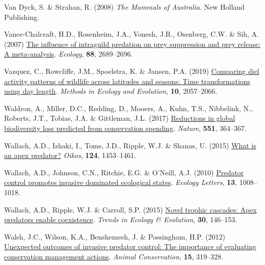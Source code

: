 \documentclass[11pt,a4paper,titlepage,twoside,openright]{style/unimelbthesis}
\newenvironment{CSLReferences}%
  {}%
  {\par}
\begin{document}
\begin{mainmatter}
\begin{CSLReferences}{1}{0}
\leavevmode{}%
Van Dyck, S. \& Strahan, R. (2008) \emph{The Mammals of {A}ustralia}. New Holland Publishing.

\leavevmode{}%
Vance-Chalcraft, H.D., Rosenheim, J.A., Vonesh, J.R., Osenberg, C.W. \& Sih, A. (2007) \href{https://doi.org/10.1890/06-1869.1}{The influence of intraguild predation on prey suppression and prey release: A meta-analysis}. \emph{Ecology}, \textbf{88}, 2689--2696.

\leavevmode{}%
Vazquez, C., Rowcliffe, J.M., Spoelstra, K. \& Jansen, P.A. (2019) \href{https://doi.org/10.1111/2041-210X.13290}{Comparing diel activity patterns of wildlife across latitudes and seasons: Time transformations using day length}. \emph{Methods in Ecology and Evolution}, \textbf{10}, 2057--2066.

\leavevmode{}%
Waldron, A., Miller, D.C., Redding, D., Mooers, A., Kuhn, T.S., Nibbelink, N., Roberts, J.T., Tobias, J.A. \& Gittleman, J.L. (2017) \href{https://doi.org/10.1038/nature24295}{Reductions in global biodiversity loss predicted from conservation spending}. \emph{Nature}, \textbf{551}, 364--367.

\leavevmode{}%
Wallach, A.D., Izhaki, I., Toms, J.D., Ripple, W.J. \& Shanas, U. (2015) \href{https://doi.org/10.1111/oik.01977}{What is an apex predator?} \emph{Oikos}, \textbf{124}, 1453--1461.

\leavevmode{}%
Wallach, A.D., Johnson, C.N., Ritchie, E.G. \& O'Neill, A.J. (2010) \href{https://doi.org/10.1111/j.1461-0248.2010.01492.x}{Predator control promotes invasive dominated ecological states}. \emph{Ecology Letters}, \textbf{13}, 1008--1018.

\leavevmode{}%
Wallach, A.D., Ripple, W.J. \& Carroll, S.P. (2015) \href{https://doi.org/10.1016/j.tree.2015.01.003}{Novel trophic cascades: Apex predators enable coexistence}. \emph{Trends in Ecology \& Evolution}, \textbf{30}, 146--153.

\leavevmode{}%
Walsh, J.C., Wilson, K.A., Benshemesh, J. \& Possingham, H.P. (2012) \href{https://doi.org/10.1111/j.1469-1795.2012.00537.x}{Unexpected outcomes of invasive predator control: The importance of evaluating conservation management actions}. \emph{Animal Conservation}, \textbf{15}, 319--328.


\end{CSLReferences}
\end{mainmatter}
\end{document}
